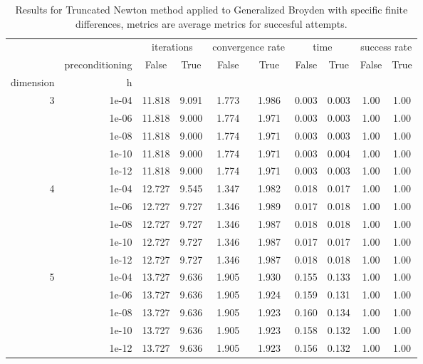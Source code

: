 \begin{table}
\centering
\caption{Results for Truncated Newton method applied to Generalized Broyden with specific finite differences, metrics are average metrics for succesful attempts.}
\label{tab:Truncated_Newton_Generalized_Broyden_fd_rel}
\begin{tabular}{rr|cc|cc|cc|cc}
\toprule
    &  & \multicolumn{2}{|c}{iterations} & \multicolumn{2}{|c}{convergence rate} & \multicolumn{2}{|c}{time} & \multicolumn{2}{|c}{success rate} \\
    & preconditioning & False & True & False & True & False & True & False & True \\
dimension & h &  &  &  &  &  &  &  &  \\
\midrule
\multirow[t]{5}{*}{3} & 1e-04 & 11.818 & 9.091 & 1.773 & 1.986 & 0.003 & 0.003 & 1.00 & 1.00 \\
    & 1e-06 & 11.818 & 9.000 & 1.774 & 1.971 & 0.003 & 0.003 & 1.00 & 1.00 \\
    & 1e-08 & 11.818 & 9.000 & 1.774 & 1.971 & 0.003 & 0.003 & 1.00 & 1.00 \\
    & 1e-10 & 11.818 & 9.000 & 1.774 & 1.971 & 0.003 & 0.004 & 1.00 & 1.00 \\
    & 1e-12 & 11.818 & 9.000 & 1.774 & 1.971 & 0.003 & 0.003 & 1.00 & 1.00 \\
\cline{1-10}
\multirow[t]{5}{*}{4} & 1e-04 & 12.727 & 9.545 & 1.347 & 1.982 & 0.018 & 0.017 & 1.00 & 1.00 \\
    & 1e-06 & 12.727 & 9.727 & 1.346 & 1.989 & 0.017 & 0.018 & 1.00 & 1.00 \\
    & 1e-08 & 12.727 & 9.727 & 1.346 & 1.987 & 0.018 & 0.018 & 1.00 & 1.00 \\
    & 1e-10 & 12.727 & 9.727 & 1.346 & 1.987 & 0.017 & 0.017 & 1.00 & 1.00 \\
    & 1e-12 & 12.727 & 9.727 & 1.346 & 1.987 & 0.018 & 0.018 & 1.00 & 1.00 \\
\cline{1-10}
\multirow[t]{5}{*}{5} & 1e-04 & 13.727 & 9.636 & 1.905 & 1.930 & 0.155 & 0.133 & 1.00 & 1.00 \\
    & 1e-06 & 13.727 & 9.636 & 1.905 & 1.924 & 0.159 & 0.131 & 1.00 & 1.00 \\
    & 1e-08 & 13.727 & 9.636 & 1.905 & 1.923 & 0.160 & 0.134 & 1.00 & 1.00 \\
    & 1e-10 & 13.727 & 9.636 & 1.905 & 1.923 & 0.158 & 0.132 & 1.00 & 1.00 \\
    & 1e-12 & 13.727 & 9.636 & 1.905 & 1.923 & 0.156 & 0.132 & 1.00 & 1.00 \\
\cline{1-10}
\bottomrule
\end{tabular}
\end{table}